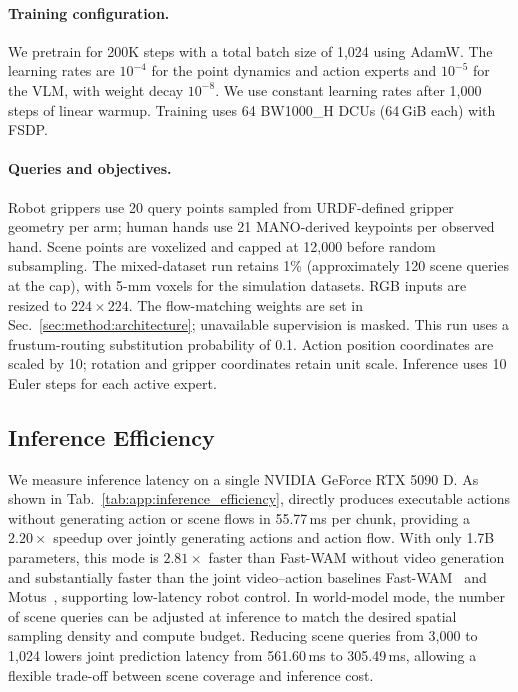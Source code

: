 \paragraph{Training configuration.}
We pretrain for 200K steps with a total batch size of 1,024 using AdamW.
The learning rates are $10^{-4}$ for the point dynamics and action experts and
$10^{-5}$ for the VLM, with weight decay $10^{-8}$.
We use constant learning rates after 1,000 steps of linear warmup.
Training uses 64 BW1000\_H DCUs (64\,GiB each) with FSDP.

\paragraph{Queries and objectives.}
Robot grippers use 20 query points sampled from URDF-defined gripper geometry
per arm; human hands use 21 MANO-derived keypoints per observed hand.
Scene points are voxelized and capped at 12,000 before random
subsampling. The mixed-dataset run retains 1\% (approximately 120 scene
queries at the cap), with 5-mm voxels for the simulation datasets.
RGB inputs are resized to $224\!\times\!224$.
The flow-matching weights are set in
Sec.~\ref{sec:method:architecture}; unavailable supervision is masked.
This run uses a frustum-routing substitution probability of 0.1. Action position coordinates are scaled by 10; rotation and gripper
coordinates retain unit scale. Inference uses 10 Euler steps for each
active expert.

\subsection{Inference Efficiency}
\label{app:inference_efficiency}

We measure inference latency on a single NVIDIA GeForce RTX 5090 D.
As shown in Tab.~\ref{tab:app:inference_efficiency}, \method{} directly
produces executable actions without generating action or scene flows
in 55.77\,ms per chunk, providing a $2.20\times$ speedup over jointly
generating actions and action flow. With only 1.7B parameters, this mode
is $2.81\times$ faster than Fast-WAM without video generation and
substantially faster than the joint video--action baselines
Fast-WAM~\citep{yuan2026fastwam} and Motus~\citep{bi2025motus},
supporting low-latency robot control. In world-model mode, the number
of scene queries can be adjusted at inference to match the desired
spatial sampling density and compute budget. Reducing scene queries
from 3,000 to 1,024 lowers joint prediction latency from 561.60\,ms
to 305.49\,ms, allowing a flexible trade-off between scene coverage
and inference cost.

